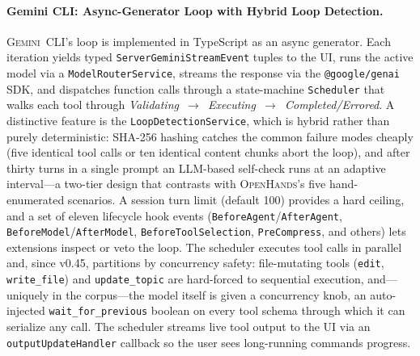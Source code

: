 \documentclass[11pt,a4paper]{article}
\newcommand{\oh}{\textsc{OpenHands}\xspace}
\newcommand{\gemini}{\textsc{Gemini~CLI}\xspace}
\begin{document}
\paragraph{Gemini CLI: Async-Generator Loop with Hybrid Loop Detection.}
\gemini{}'s loop is implemented in TypeScript as an async generator.
Each iteration yields typed \texttt{ServerGeminiStreamEvent} tuples to the UI, runs the active model via a \texttt{ModelRouterService}, streams the response via the \texttt{@google/genai} SDK, and dispatches function calls through a state-machine \texttt{Scheduler} that walks each tool through \emph{Validating~$\to$~Executing~$\to$~Completed/Errored}.
A distinctive feature is the \texttt{LoopDetectionService}, which is hybrid rather than purely deterministic: SHA-256 hashing catches the common failure modes cheaply (five identical tool calls or ten identical content chunks abort the loop), and after thirty turns in a single prompt an LLM-based self-check runs at an adaptive interval---a two-tier design that contrasts with \oh{}'s five hand-enumerated scenarios.
A session turn limit (default 100) provides a hard ceiling, and a set of eleven lifecycle hook events (\texttt{BeforeAgent}/\texttt{AfterAgent}, \texttt{BeforeModel}/\texttt{AfterModel}, \texttt{BeforeToolSelection}, \texttt{PreCompress}, and others) lets extensions inspect or veto the loop.
The scheduler executes tool calls in parallel and, since v0.45, partitions by concurrency safety: file-mutating tools (\texttt{edit}, \texttt{write\_file}) and \texttt{update\_topic} are hard-forced to sequential execution, and---uniquely in the corpus---the model itself is given a concurrency knob, an auto-injected \texttt{wait\_for\_previous} boolean on every tool schema through which it can serialize any call.
The scheduler streams live tool output to the UI via an \texttt{outputUpdateHandler} callback so the user sees long-running commands progress.
\end{document}
